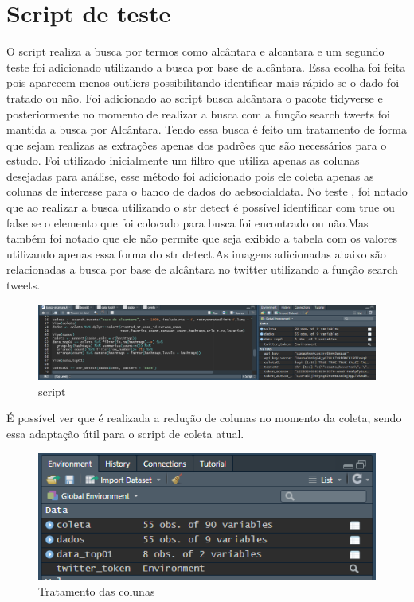 \documentclass[a4paper]{article}
\begin{document}
\section{Script de teste}
O script realiza a busca por termos como alcântara e alcantara e um segundo teste foi adicionado utilizando a busca por base de alcântara. Essa ecolha foi feita pois aparecem menos outliers possibilitando identificar mais rápido se o dado foi tratado ou não.
Foi adicionado ao script busca alcântara o pacote tidyverse e posteriormente no momento de realizar a busca com a função search tweets foi mantida a busca por Alcântara. Tendo essa busca é feito um tratamento de forma que sejam realizas as extrações apenas dos padrões que são necessários para o estudo.
Foi utilizado inicialmente um filtro que utiliza apenas as colunas desejadas para análise, esse método foi adicionado pois ele coleta apenas as colunas de interesse para o banco de dados do aebsocialdata.
No teste , foi notado que ao realizar a busca utilizando o str detect é possível identificar com true ou false se o elemento que foi colocado para busca foi encontrado ou não.Mas também foi notado que ele não permite que seja exibido a tabela com os valores utilizando apenas essa forma do str detect.As imagens adicionadas abaixo são relacionadas a busca por base de alcântara no twitter utilizando a função search tweets.
\begin{figure}[htb!]
    \centering
    \includegraphics[width=0.9\linewidth]{style/image/teste03.png}
    \caption{script}
    \label{fig:script}
\end{figure}

É possível ver que é realizada a redução de colunas no momento da coleta, sendo essa adaptação útil para o script de coleta atual.

\begin{figure}[htb!]
    \centering
    \includegraphics[width=0.5\linewidth]{style/image/teste05.png}
    \caption{Tratamento das colunas}
    \label{fig:coluna}
\end{figure}
\end{document}
